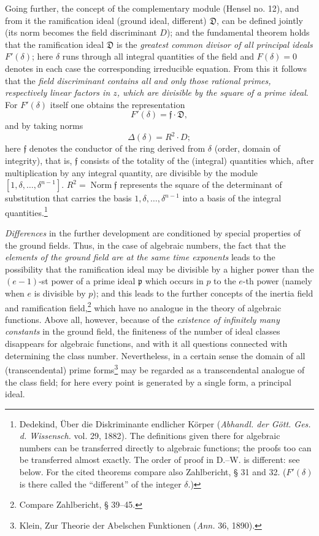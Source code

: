 \documentclass[11pt]{article}
\providecommand{\frp}{\mathfrak p}
\providecommand{\frf}{\mathfrak f}
\providecommand{\frD}{\mathfrak D}
\begin{document}
Going further, the concept of the complementary module (Hensel no. 12), and from it the ramification ideal (ground ideal, different) \(\frD\), can be defined jointly (its norm becomes the field discriminant \(D\)); and the fundamental theorem holds that the ramification ideal \(\frD\) is the \emph{greatest common divisor of all principal ideals \(F'(\delta)\)}; here \(\delta\) runs through all integral quantities of the field and \(F(\delta)=0\) denotes in each case the corresponding irreducible equation. From this it follows that the \emph{field discriminant contains all and only those rational primes, respectively linear factors in \(z\), which are divisible by the square of a prime ideal}. For \(F'(\delta)\) itself one obtains the representation
\[
F'(\delta)=\frf\cdot\frD,
\]
and by taking norms
\[
\Delta(\delta)=R^2\cdot D;
\]
here \(\frf\) denotes the conductor of the ring derived from \(\delta\) (order, domain of integrity), that is, \(\frf\) consists of the totality of the (integral) quantities which, after multiplication by any integral quantity, are divisible by the module \([1,\delta,\ldots,\delta^{n-1}]\). \(R^2=\operatorname{Norm}\frf\) represents the square of the determinant of substitution that carries the basis \(1,\delta,\ldots,\delta^{n-1}\) into a basis of the integral quantities.\footnote{Dedekind, Über die Diskriminante endlicher Körper (\emph{Abhandl. der Gött. Ges. d. Wissensch.} vol. 29, 1882). The definitions given there for algebraic numbers can be transferred directly to algebraic functions; the proofs too can be transferred almost exactly. The order of proof in D.--W. is different: see below. For the cited theorems compare also Zahlbericht, § 31 and 32. (\(F'(\delta)\) is there called the ``different'' of the integer \(\delta\).)}

\emph{Differences} in the further development are conditioned by special properties of the ground fields. Thus, in the case of algebraic numbers, the fact that the \emph{elements of the ground field are at the same time exponents} leads to the possibility that the ramification ideal may be divisible by a higher power than the \((e-1)\)-st power of a prime ideal \(\frp\) which occurs in \(p\) to the \(e\)-th power (namely when \(e\) is divisible by \(p\)); and this leads to the further concepts of the inertia field and ramification field,\footnote{Compare Zahlbericht, § 39--45.} which have no analogue in the theory of algebraic functions. Above all, however, because of the \emph{existence of infinitely many constants} in the ground field, the finiteness of the number of ideal classes disappears for algebraic functions, and with it all questions connected with determining the class number. Nevertheless, in a certain sense the domain of all (transcendental) prime forms\footnote{Klein, Zur Theorie der Abelschen Funktionen (\emph{Ann.} 36, 1890).} may be regarded as a transcendental analogue of the class field; for here every point is generated by a single form, a principal ideal.
\end{document}
